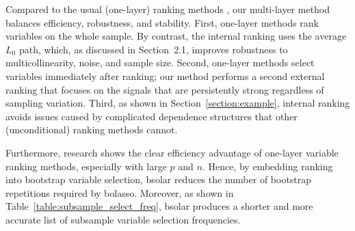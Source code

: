 \documentclass[11pt,review,authoryear]{elsarticle}
\begin{document}
Compared to the usual (one-layer) ranking methods \citep{fan2008sure, hall2009usingb, hall2009using, li2012robust, li2012feature}, our multi-layer method balances efficiency, robustness, and stability. First, one-layer methods rank variables on the whole sample. By contrast, the internal ranking uses the average $L_0$ path, which, as discussed in Section~2.1, improves robustness to multicollinearity, noise, and sample size. Second, one-layer methods select variables immediately after ranking; our method performs a second external ranking that focuses on the signals that are persistently strong regardless of sampling variation. Third, as shown in Section~\ref{section:example}, internal ranking avoids issues caused by complicated dependence structures that other (unconditional) ranking methods cannot.

Furthermore, research shows the clear efficiency advantage of one-layer variable ranking methods, especially with large $p$ and $n$. Hence, by embedding ranking into bootstrap variable selection, bsolar reduces the number of bootstrap repetitions required by bolasso. Moreover, as shown in Table~\ref{table:subsample_select_freq}, bsolar produces a shorter and more accurate list of subsample variable selection frequencies.
\end{document}
